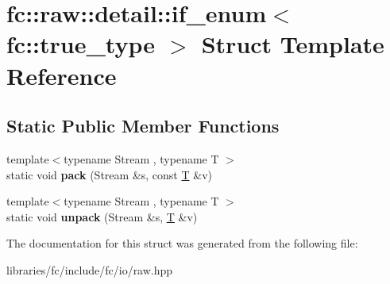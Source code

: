 \hypertarget{structfc_1_1raw_1_1detail_1_1if__enum_3_01fc_1_1true__type_01_4}{}\section{fc\+:\+:raw\+:\+:detail\+:\+:if\+\_\+enum$<$ fc\+:\+:true\+\_\+type $>$ Struct Template Reference}
\label{structfc_1_1raw_1_1detail_1_1if__enum_3_01fc_1_1true__type_01_4}
\subsection*{Static Public Member Functions}
\begin{DoxyCompactItemize}
\item 
\mbox{\label{structfc_1_1raw_1_1detail_1_1if__enum_3_01fc_1_1true__type_01_4_a727818794838942142f839ecb81fd31e}} 
{\footnotesize template$<$typename Stream , typename T $>$ }\\static void {\bfseries pack} (Stream \&s, const \mbox{\hyperlink{struct_t}{T}} \&v)
\item 
\mbox{\label{structfc_1_1raw_1_1detail_1_1if__enum_3_01fc_1_1true__type_01_4_aca96ad592fe969db459074f0872da07f}} 
{\footnotesize template$<$typename Stream , typename T $>$ }\\static void {\bfseries unpack} (Stream \&s, \mbox{\hyperlink{struct_t}{T}} \&v)
\end{DoxyCompactItemize}


The documentation for this struct was generated from the following file\+:\begin{DoxyCompactItemize}
\item 
libraries/fc/include/fc/io/raw.\+hpp\end{DoxyCompactItemize}
